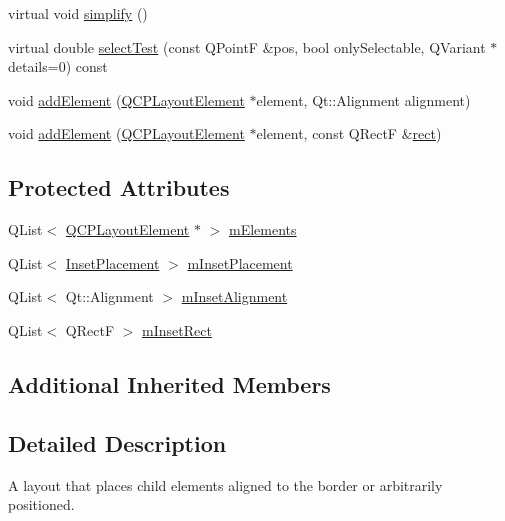 \begin{DoxyCompactItemize}
\item 
virtual void \hyperlink{classQCPLayoutInset_abb9eb23bf2d7c587a8abe02d065eae0a}{simplify} ()
\item 
virtual double \hyperlink{classQCPLayoutInset_ab5a2f2b88c05e369fd7da9583d17aa3a}{select\+Test} (const Q\+PointF \&pos, bool only\+Selectable, Q\+Variant $\ast$details=0) const 
\item 
void \hyperlink{classQCPLayoutInset_ad61529eb576af7f04dff94abb10c745a}{add\+Element} (\hyperlink{classQCPLayoutElement}{Q\+C\+P\+Layout\+Element} $\ast$element, Qt\+::\+Alignment alignment)
\item 
void \hyperlink{classQCPLayoutInset_a8ff61fbee4a1f0ff45c398009d9f1e56}{add\+Element} (\hyperlink{classQCPLayoutElement}{Q\+C\+P\+Layout\+Element} $\ast$element, const Q\+RectF \&\hyperlink{classQCPLayoutElement_affdfea003469aac3d0fac5f4e06171bc}{rect})
\end{DoxyCompactItemize}
\subsection*{Protected Attributes}
\begin{DoxyCompactItemize}
\item 
Q\+List$<$ \hyperlink{classQCPLayoutElement}{Q\+C\+P\+Layout\+Element} $\ast$ $>$ \hyperlink{classQCPLayoutInset_a8fff7eae9a1be9a5c1e544fb379f682f}{m\+Elements}
\item 
Q\+List$<$ \hyperlink{classQCPLayoutInset_a8b9e17d9a2768293d2a7d72f5e298192}{Inset\+Placement} $>$ \hyperlink{classQCPLayoutInset_a57a0a4e445cc78eada29765ecf092abe}{m\+Inset\+Placement}
\item 
Q\+List$<$ Qt\+::\+Alignment $>$ \hyperlink{classQCPLayoutInset_a55e9b84c310136ff985a6544184ab64a}{m\+Inset\+Alignment}
\item 
Q\+List$<$ Q\+RectF $>$ \hyperlink{classQCPLayoutInset_aaa8f6b5029458f3d97a65239524a2b33}{m\+Inset\+Rect}
\end{DoxyCompactItemize}
\subsection*{Additional Inherited Members}


\subsection{Detailed Description}
A layout that places child elements aligned to the border or arbitrarily positioned. 

